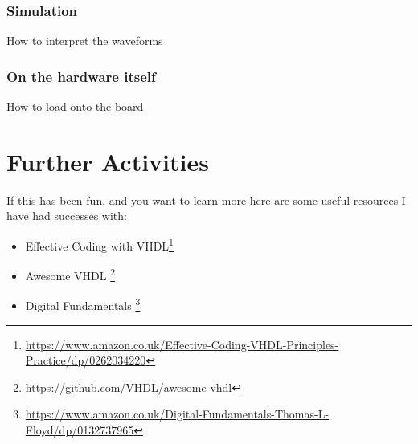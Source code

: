 \documentclass[11pt,a4paper]{article}
\begin{document}
\subsubsection{Simulation}
How to interpret the waveforms
\subsubsection{On the hardware itself}
How to load onto the board

\section{Further Activities}
If this has been fun, and you want to learn more here are some useful resources I have had successes with:

\begin{itemize}
    \item Effective Coding with VHDL\footnote{\url{https://www.amazon.co.uk/Effective-Coding-VHDL-Principles-Practice/dp/0262034220}} 
    \item Awesome VHDL \footnote{\url{https://github.com/VHDL/awesome-vhdl}}
    \item Digital Fundamentals \footnote{\url{https://www.amazon.co.uk/Digital-Fundamentals-Thomas-L-Floyd/dp/0132737965}}
\end{itemize}
\end{document}
